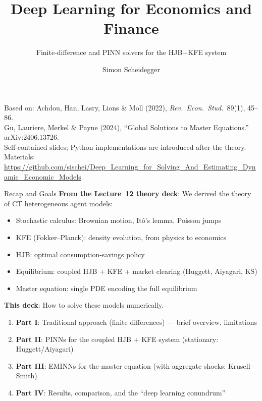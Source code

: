 \documentclass[aspectratio=169,11pt]{beamer}
\title[Deep Learning for Dynamic Economic Models]
{Deep Learning for Economics and Finance}
\subtitle{Finite-difference and PINN solvers for the HJB+KFE system}
\author{Simon Scheidegger}
\institute[HEC Lausanne]{HEC, University of Lausanne}
\date{}
\newcommand{\emphc}[1]{\textcolor{harvardcrimson}{#1}}
\begin{document}

{
\begin{frame}
\titlepage
\vspace{-0.4cm}
\begin{center}
{\footnotesize Based on: Achdou, Han, Lasry, Lions \& Moll (2022), \emph{Rev.\ Econ.\ Stud.}\ 89(1), 45--86.}\\[2pt]
{\footnotesize Gu, Lauriere, Merkel \& Payne (2024), ``Global Solutions to Master Equations.'' arXiv:2406.13726.}\\[2pt]
{\footnotesize Self-contained slides; Python implementations are introduced after the theory.}\\[4pt]
{\footnotesize Materials: \url{https://github.com/sischei/Deep_Learning_for_Solving_And_Estimating_Dynamic_Economic_Models}}
\end{center}
\end{frame}
}

\begin{frame}{Recap and Goals}
\textbf{From the Lecture~12 theory deck}: We derived the \emphc{theory} of CT heterogeneous agent models:
\begin{itemize}\itemsep2pt
    \item Stochastic calculus: Brownian motion, It\^o's lemma, Poisson jumps
    \item KFE (Fokker--Planck): density evolution, from physics to economics
    \item HJB: optimal consumption-savings policy
    \item Equilibrium: coupled HJB + KFE + market clearing (Huggett, Aiyagari, KS)
    \item Master equation: single PDE encoding the full equilibrium
\end{itemize}

\vspace{0.4em}
\textbf{This deck}: How to \emphc{solve} these models numerically.
\begin{enumerate}\itemsep3pt
    \item \textbf{Part I}: Traditional approach (finite differences) --- brief overview, limitations
    \item \textbf{Part II}: \emphc{PINNs for the coupled HJB + KFE system} (stationary: Huggett/Aiyagari)
    \item \textbf{Part III}: \emphc{EMINNs for the master equation} (with aggregate shocks: Krusell--Smith)
    \item \textbf{Part IV}: Results, comparison, and the ``deep learning conundrum''
\end{enumerate}
\end{frame}
\end{document}
